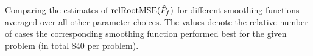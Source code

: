 Comparing the estimates of $\textup{relRootMSE}(\hat{P}_f)$ for different smoothing functions averaged over  all other parameter choices. The values denote the relative number of cases the corresponding smoothing function performed best for the given problem (in total 840 per problem).